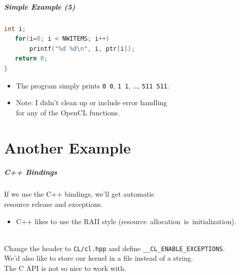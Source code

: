 \begin{frame}[fragile]
  \frametitle{Simple Example (5)}



  \begin{lstlisting}[language=C]
   int i;
   for(i=0; i < NWITEMS; i++)
       printf("%d %d\n", i, ptr[i]);
   return 0;
}
  \end{lstlisting}

  \begin{itemize}
    \item The program simply prints {\tt 0 0}, {\tt 1 1}, \ldots, {\tt 511 511}.
    \item Note: I didn't clean up or include error handling\\ for any of the
      OpenCL functions.
  \end{itemize}

\end{frame}

\part{Another Example}
\frame{\partpage}

\begin{frame}
  \frametitle{C++ Bindings}


    If we use the C++ bindings, we'll get automatic \\ resource release and
      exceptions.
      \begin{itemize}
        \item C++ likes to use the RAII style
          (resource~allocation~is~initialization).
      \end{itemize}~\\
    Change the header to {\tt CL/cl.hpp} and define
      {\tt \_\_CL\_ENABLE\_EXCEPTIONS}.\\[.5em]
    We'd also like to store our kernel in a file instead of a string.\\[.5em]
    The C API is not so nice to work with.

\end{frame}

